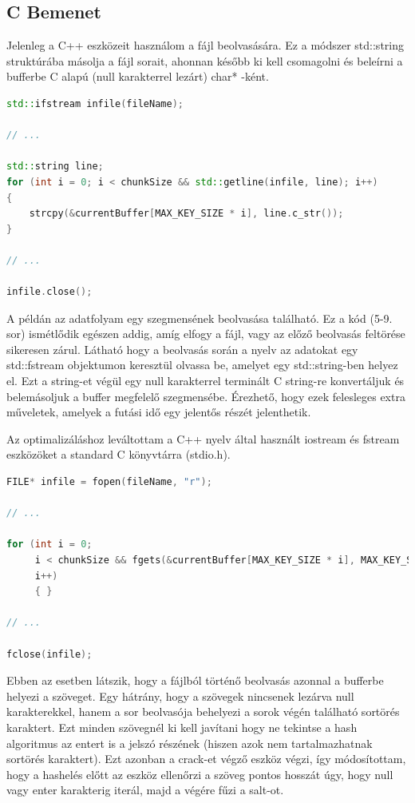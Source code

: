 \subsection{C Bemenet}



Jelenleg a C++ eszközeit használom a fájl beolvasására. Ez a módszer std::string struktúrába másolja a fájl sorait, ahonnan később ki kell csomagolni és beleírni a bufferbe C alapú (null karakterrel lezárt) char* -ként.


\begin{lstlisting}[language={C++}]
std::ifstream infile(fileName);

// ...

std::string line;
for (int i = 0; i < chunkSize && std::getline(infile, line); i++)
{
    strcpy(&currentBuffer[MAX_KEY_SIZE * i], line.c_str());
}

// ...

infile.close();
\end{lstlisting}


A példán az adatfolyam egy szegmensének beolvasása található. Ez a kód (5-9. sor) ismétlődik egészen addig, amíg elfogy a fájl, vagy az előző beolvasás feltörése sikeresen zárul. Látható hogy a beolvasás során a nyelv az adatokat egy std::fstream objektumon keresztül olvassa be, amelyet egy std::string-ben helyez el. Ezt a string-et végül egy null karakterrel terminált C string-re konvertáljuk és belemásoljuk a buffer megfelelő szegmensébe. Érezhető, hogy ezek felesleges extra műveletek, amelyek a futási idő egy jelentős részét jelenthetik.

Az optimalizáláshoz leváltottam a C++ nyelv által használt iostream és fstream eszközöket a standard C könyvtárra (stdio.h).

\begin{lstlisting}[language={C}]
FILE* infile = fopen(fileName, "r");

// ...

for (int i = 0;
     i < chunkSize && fgets(&currentBuffer[MAX_KEY_SIZE * i], MAX_KEY_SIZE, infile) != NULL;
     i++)
     { }

// ...

fclose(infile);
\end{lstlisting}


Ebben az esetben látszik, hogy a fájlból történő beolvasás azonnal a bufferbe helyezi a szöveget. Egy hátrány, hogy a szövegek nincsenek lezárva null karakterekkel, hanem a sor beolvasója behelyezi a sorok végén található sortörés karaktert. Ezt minden szövegnél ki kell javítani hogy ne tekintse a hash algoritmus az entert is a jelszó részének (hiszen azok nem tartalmazhatnak sortörés karaktert). Ezt azonban a crack-et végző eszköz végzi, így módosítottam, hogy a hashelés előtt az eszköz ellenőrzi a szöveg pontos hosszát úgy, hogy null vagy enter karakterig iterál, majd a végére fűzi a salt-ot.



